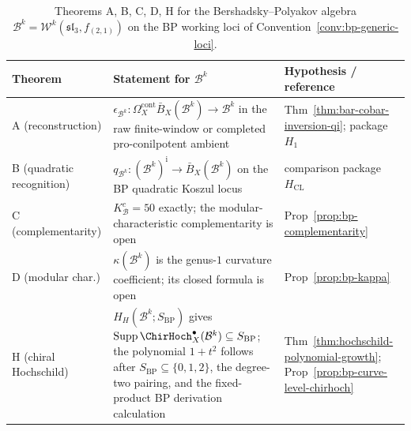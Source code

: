 \begin{table}[ht]
\centering
\small
\caption{Theorems A, B, C, D, H for the Bershadsky--Polyakov
algebra $\mathcal{B}^k = \mathcal{W}^k(\mathfrak{sl}_3, f_{(2,1)})$
on the BP working loci of Convention~\ref{conv:bp-generic-loci}.}
\label{tab:bp-five-theorems}
\begin{tabular}{lll}
\toprule
\textbf{Theorem} & \textbf{Statement for $\mathcal{B}^k$}
 & \textbf{Hypothesis / reference} \\
\midrule
A (reconstruction) &
 $\epsilon_{\mathcal B^k}\colon
 \Omega_X^{\mathrm{cont}}\bar B_X(\mathcal B^k)\to\mathcal B^k$
 in the raw finite-window or completed pro-conilpotent ambient
 & Thm~\ref{thm:bar-cobar-inversion-qi}; package $H_1$ \\
B (quadratic recognition) &
 $q_{\mathcal B^k}\colon(\mathcal B^k)^{\mathrm i}
 \to\bar B_X(\mathcal B^k)$ on the BP quadratic Koszul locus
 & comparison package $H_{\mathrm{CL}}$ \\
C (complementarity) &
 $K^c_{\mathcal{B}}=50$ exactly; the modular-characteristic
 complementarity is open
 & Prop~\ref{prop:bp-complementarity} \\
D (modular char.) &
 $\kappa(\mathcal{B}^k)$ is the genus-$1$ curvature coefficient;
 its closed formula is open
 & Prop~\ref{prop:bp-kappa} \\
H (chiral Hochschild) &
$H_H(\mathcal B^k;S_{\mathrm{BP}})$ gives
$\operatorname{Supp}\ChirHoch_X^\bullet(\mathcal B^k)
\subseteq S_{\mathrm{BP}}$; the polynomial $1+t^2$ follows after
$S_{\mathrm{BP}}\subseteq\{0,1,2\}$, the degree-two pairing, and the
fixed-product BP derivation calculation
 & Thm~\ref{thm:hochschild-polynomial-growth};
 Prop~\ref{prop:bp-curve-level-chirhoch} \\
\bottomrule
\end{tabular}
\end{table}


